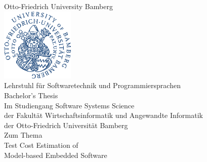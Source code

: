 \begin{titlepage}
    
    \newcommand{\HRule}{\rule{\linewidth}{0.5mm}} %

\center %
 

\Large{Otto-Friedrich University Bamberg}\\[0.5cm]  %

\includegraphics[width=3.5cm]{logo.png} %
\\[0.0cm]

\LARGE{Lehrstuhl für Softwaretechnik und Programmiersprachen}\\[0.5cm] %
\vspace{1cm}
\LARGE{Bachelor's Thesis}\\[0.5cm]
\large{Im Studiengang Software Systems Science}\\
\large{der Fakultät Wirtschaftsinformatik und Angewandte Informatik}\\
\large{der Otto-Friedrich Universität Bamberg}\\
\vspace{1.5cm}
\large{Zum Thema}\\[0.5cm] %


{\huge Test Cost Estimation of}\\[0.2cm]
{\huge Model-based Embedded Software}\\[0.4cm] %
 

\end{titlepage}
